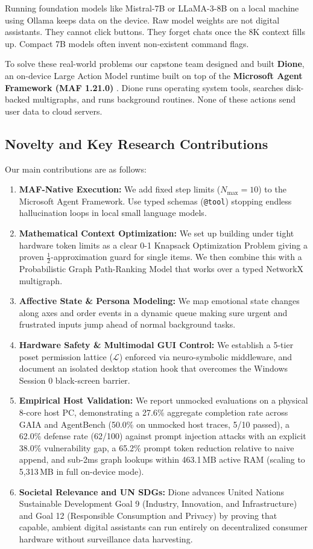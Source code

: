 \documentclass[conference,a4paper]{IEEEtran}
\begin{document}
Running foundation models like Mistral-7B or LLaMA-3-8B on a local machine using Ollama keeps data on the device. Raw model weights are not digital assistants. They cannot click buttons. They forget chats once the 8K context fills up. Compact 7B models often invent non-existent command flags.

To solve these real-world problems our capstone team designed and built \textbf{Dione}, an on-device Large Action Model runtime built on top of the \textbf{Microsoft Agent Framework (MAF 1.21.0)} \cite{microsoft2025agentframework}. Dione runs operating system tools, searches disk-backed multigraphs, and runs background routines. None of these actions send user data to cloud servers.

\subsection{Novelty and Key Research Contributions}
Our main contributions are as follows:
\begin{enumerate}
    \item \textbf{MAF-Native Execution:} We add fixed step limits ($N_{\text{max}} = 10$) to the Microsoft Agent Framework. Use typed schemas (\texttt{@tool}) stopping endless hallucination loops in local small language models.
    \item \textbf{Mathematical Context Optimization:} We set up building under tight hardware token limits as a clear 0-1 Knapsack Optimization Problem giving a proven $\frac{1}{2}$-approximation guard for single items. We then combine this with a Probabilistic Graph Path-Ranking Model that works over a typed NetworkX multigraph.
    \item \textbf{Affective State \& Persona Modeling:} We map emotional state changes along axes and order events in a dynamic queue making sure urgent and frustrated inputs jump ahead of normal background tasks.
    \item \textbf{Hardware Safety \& Multimodal GUI Control:} We establish a 5-tier poset permission lattice ($\mathcal{L}$) enforced via neuro-symbolic middleware, and document an isolated desktop station hook that overcomes the Windows Session 0 black-screen barrier.
    \item \textbf{Empirical Host Validation:} We report unmocked evaluations on a physical 8-core host PC, demonstrating a 27.6\% aggregate completion rate across GAIA and AgentBench (50.0\% on unmocked host traces, 5/10 passed), a 62.0\% defense rate (62/100) against prompt injection attacks with an explicit 38.0\% vulnerability gap, a 65.2\% prompt token reduction relative to naive append, and sub-2ms graph lookups within 463.1\,MB active RAM (scaling to 5,313\,MB in full on-device mode).
    \item \textbf{Societal Relevance and UN SDGs:} Dione advances United Nations Sustainable Development Goal 9 (Industry, Innovation, and Infrastructure) and Goal 12 (Responsible Consumption and Privacy) by proving that capable, ambient digital assistants can run entirely on decentralized consumer hardware without surveillance data harvesting.
\end{enumerate}
\end{document}
